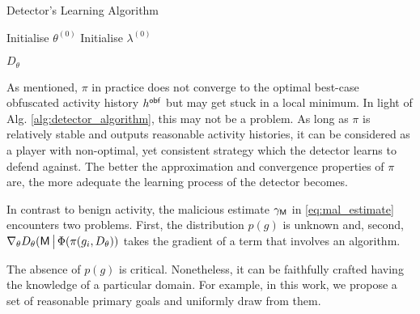 \begin{algorithm}
    \caption{Detector's Learning Algorithm}\label{alg:detector_algorithm}

    Initialise $\theta^{(0)}$\;
    Initialise $\lambda^{(0)}$\;

    \Return $D_\theta$
\end{algorithm}

As mentioned, $\pi$ in practice does not converge to the optimal best-case obfuscated activity history $h^{\mathsf{obf}}$ but may get stuck in a local minimum. In light of Alg. \ref{alg:detector_algorithm}, this may not be a problem. As long as $\pi$ is relatively stable and outputs reasonable activity histories, it can be considered as a player with non-optimal, yet consistent strategy which the detector learns to defend against. The better the approximation and convergence properties of $\pi$ are, the more adequate the learning process of the detector becomes.

In contrast to benign activity, the malicious estimate $\gamma_{\mathsf{M}}$ in \eqref{eq:mal_estimate} encounters two problems. First, the distribution $p(g)$ is unknown and, second, $\nabla_\theta D_\theta(\mathsf{M} \,\big|\, \Phi( \pi (g_i, D_\theta) )$ takes the gradient of a term that involves an algorithm.

The absence of $p(g)$ is critical. Nonetheless, it can be faithfully crafted having the knowledge of a particular domain. For example, in this work, we propose a set of reasonable primary goals and uniformly draw from them.

